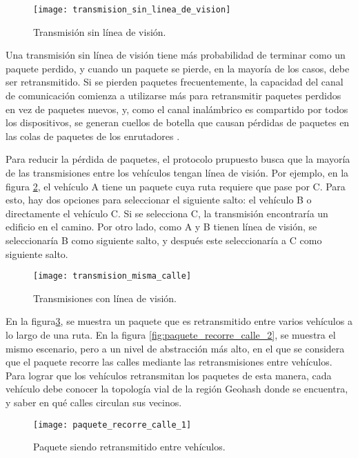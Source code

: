 \begin{figure}[th]
\centering
\texttt{[image: transmision\_sin\_linea\_de\_vision]}
\decoRule
\caption[Transmisión sin línea de visión]{Transmisión sin línea de visión.}
\label{fig:transmision_sin_linea_de_vision}
\end{figure}

Una transmisión sin línea de visión tiene más probabilidad de terminar como un
paquete perdido, y cuando un paquete se pierde, en la mayoría de los casos, debe
ser retransmitido. Si se pierden paquetes frecuentemente, la capacidad del canal
de comunicación comienza a utilizarse más para retransmitir paquetes perdidos en
vez de paquetes nuevos, y, como el canal inalámbrico es compartido por todos los
dispositivos, se generan cuellos de botella que causan pérdidas de paquetes en
las colas de paquetes de los enrutadores \cite{Kurose2013}.

Para reducir la pérdida de paquetes, el protocolo prupuesto busca que la mayoría
de las transmisiones entre los vehículos tengan línea de visión. Por ejemplo, en
la figura \ref{fig:transmision_misma_calle}, el vehículo A tiene un paquete cuya
ruta requiere que pase por C. Para esto, hay dos opciones para seleccionar el
siguiente salto: el vehículo B o directamente el vehículo C. Si se selecciona
C, la transmisión encontraría un edificio en el camino. Por otro lado, como A y
B tienen línea de visión, se seleccionaría B como siguiente salto, y después
este seleccionaría a C como siguiente salto.

\begin{figure}[th]
\centering
\texttt{[image: transmision\_misma\_calle]}
\decoRule
\caption[Transmisiones con línea de visión]{Transmisiones con línea de visión.}
\label{fig:transmision_misma_calle}
\end{figure}

En la figura\ref{fig:paquete_recorre_calle_1}, se muestra un paquete que es
retransmitido entre varios vehículos a lo largo de una ruta. En la figura
\ref{fig:paquete_recorre_calle_2}, se muestra el mismo escenario, pero a un
nivel de abstracción más alto, en el que se considera que el paquete recorre las
calles mediante las retransmisiones entre vehículos. Para lograr que los
vehículos retransmitan los paquetes de esta manera, cada vehículo debe conocer
la topología vial de la región Geohash donde se encuentra, y saber en qué calles
circulan sus vecinos.

\begin{figure}[th]
\centering
\texttt{[image: paquete\_recorre\_calle\_1]}
\decoRule
\caption[Paquete siendo retransmitido entr vehículos]{Paquete siendo
retransmitido entre vehículos.}
\label{fig:paquete_recorre_calle_1}
\end{figure}

